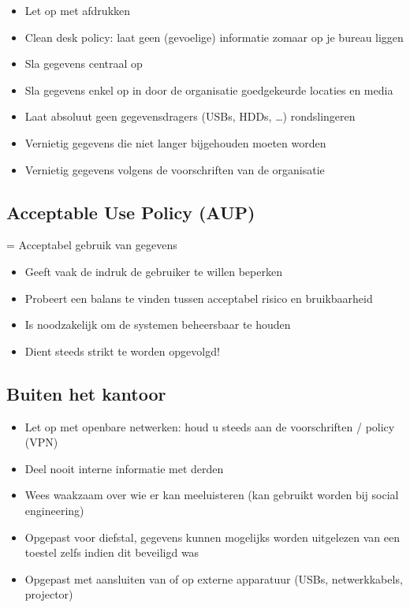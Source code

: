 \documentclass{article}
\begin{document}
\begin{itemize}
    \item Let op met afdrukken
    \item Clean desk policy: laat geen (gevoelige) informatie zomaar op je bureau liggen
    \item Sla gegevens centraal op
    \item Sla gegevens enkel op in door de organisatie goedgekeurde locaties en media
    \item Laat absoluut geen gegevensdragers (USBs, HDDs, \dots) rondslingeren
    \item Vernietig gegevens die niet langer bijgehouden moeten worden
    \item Vernietig gegevens volgens de voorschriften van de organisatie
\end{itemize}

\subsection{Acceptable Use Policy (AUP)}

= Acceptabel gebruik van gegevens

\begin{itemize}
    \item Geeft vaak de indruk de gebruiker te willen beperken
    \item Probeert een balans te vinden tussen acceptabel risico en bruikbaarheid
    \item Is noodzakelijk om de systemen beheersbaar te houden
    \item Dient steeds strikt te worden opgevolgd!
\end{itemize}

\subsection{Buiten het kantoor}

\begin{itemize}
    \item Let op met openbare netwerken: houd u steeds aan de voorschriften / policy (VPN)
    \item Deel nooit interne informatie met derden
    \item Wees waakzaam over wie er kan meeluisteren (kan gebruikt worden bij social engineering)
    \item Opgepast voor diefstal, gegevens kunnen mogelijks worden uitgelezen van een toestel zelfs indien dit beveiligd was
    \item Opgepast met aansluiten van of op externe apparatuur (USBs, netwerkkabels, projector)
\end{itemize}
\end{document}
